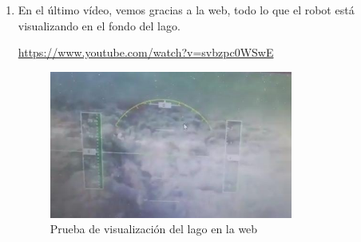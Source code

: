 \begin{enumerate}
\item En el último vídeo, vemos gracias a la web, todo lo que el robot está visualizando en el fondo del lago.
\begin{center}
\url{https://www.youtube.com/watch?v=svbzpc0WSwE}
 \end{center}
 
 \begin{figure} [hbtp]
  \begin{center}
    \includegraphics[width=8cm]{img/cap5/web}
  \end{center}
  \caption{Prueba de visualización del lago en la web}
  \label{fig:web}
 \end{figure} 


\end{enumerate}